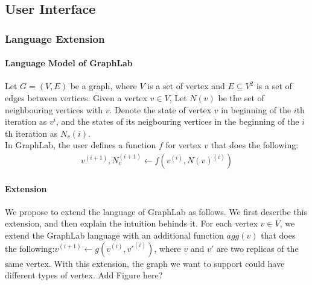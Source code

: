 \documentclass[11pt]{article}
\begin{document}
\subsection{User Interface}
\subsubsection{Language Extension}
\paragraph{Language Model of GraphLab} Let $G=(V,E)$ be a graph, where 
$V$ is a set of vertex and
$E\subseteq V^2$ is a set of edges between vertices. Given a vertex $v \in V$,
Let $N(v)$ be the set of neighbouring vertices with $v$. Denote the state of 
vertex $v$ in beginning of the $i$th iteration as $v^{i}$, and the states of 
its neigbouring vertices in the beginning of the $i$th iteration as $N_v(i)$.\\
In GraphLab, the user defines a function $f$ for vertex $v$ that does the 
following:\\
\begin{eqnarray*}
 v^{(i+1)}, N_v^{(i+1)} \leftarrow f(v^{(i)}, N(v)^{(i)})
\end{eqnarray*}

\paragraph{Extension} We propose to extend the language of GraphLab as follows. 
We first describe this extension,
and then explain the intuition behinds it.
For each vertex $v\in V$, we extend the GraphLab language with an additional 
function $agg(v)$ that does the
following:$v^{(i+1)}\leftarrow g(v^{(i)}, v'^{(i)})$, where $v$ and $v'$ are 
two replicas of the same vertex. With this extension, the graph we want to 
support could have different types of vertex.	Add Figure here?
\end{document}
